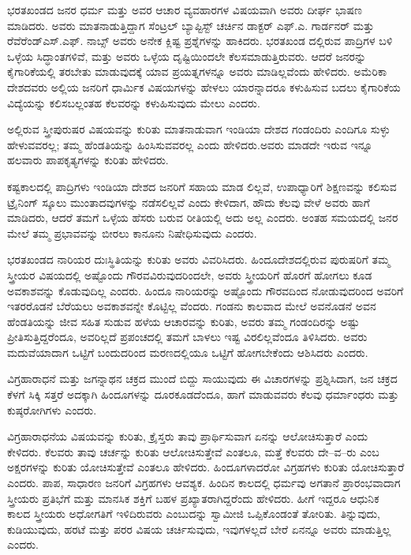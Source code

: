 ಭರತಖಂಡದ ಜನರ ಧರ್ಮ ಮತ್ತು ಅವರ ಆಚಾರ ವ್ಯವಹಾರಗಳ ವಿಷಯವಾಗಿ ಅವರು ದೀರ್ಘ ಭಾಷಣ ಮಾಡಿದರು. ಅವರು ಮಾತನಾಡುತ್ತಿದ್ದಾಗ ಸೆಂಟ್ರಲ್​ ಬ್ಯಾಪ್ಟಿಸ್ಟ್​ ಚರ್ಚಿನ ಡಾಕ್ಟರ್​ ಎಫ್​.ಎ. ಗಾರ್ಡನರ್​ ಮತ್ತು ರೆವೆರೆಂಡ್​ ಎಸ್​.ಎಫ್​. ನಾಬ್ಸ್​ ಅವರು ಅನೇಕ ಕ್ಲಿಷ್ಟ ಪ್ರಶ್ನೆಗಳನ್ನು ಹಾಕಿದರು. ಭರತಖಂಡ ದಲ್ಲಿರುವ ಪಾದ್ರಿಗಳ ಬಳಿ ಒಳ್ಳೆಯ ಸಿದ್ಧಾಂತಗಳಿವೆ, ಮತ್ತು ಅವರು ಒಳ್ಳೆಯ ದೃಷ್ಟಿಯಿಂದಲೇ ಕೆಲಸಮಾಡುತ್ತಿರುವರು. ಆದರೆ ಜನರನ್ನು ಕೈಗಾರಿಕೆಯಲ್ಲಿ ತರಬೇತು ಮಾಡುವುದಕ್ಕೆ ಯಾವ ಪ್ರಯತ್ನಗಳನ್ನೂ ಅವರು ಮಾಡಿಲ್ಲವೆಂದು ಹೇಳಿದರು. ಅಮೆರಿಕಾ ದೇಶದವರು ಅಲ್ಲಿಯ ಜನರಿಗೆ ಧಾರ್ಮಿಕ ವಿಷಯಗಳನ್ನು ಹೇಳಲು ಯಾರನ್ನಾದರೂ ಕಳುಹಿಸುವ ಬದಲು ಕೈಗಾರಿಕೆಯ ವಿದ್ಯೆಯನ್ನು ಕಲಿಸಬಲ್ಲಂತಹ ಕೆಲವರನ್ನು ಕಳುಹಿಸುವುದು ಮೇಲು ಎಂದರು.

ಅಲ್ಲಿರುವ ಸ್ತ್ರೀಪುರುಷರ ವಿಷಯವನ್ನು ಕುರಿತು ಮಾತನಾಡುವಾಗ ಇಂಡಿಯಾ ದೇಶದ ಗಂಡಂದಿರು ಎಂದಿಗೂ ಸುಳ್ಳು ಹೇಳುವವರಲ್ಲ; ತಮ್ಮ ಹೆಂಡತಿಯನ್ನು ಹಿಂಸಿಸುವವರಲ್ಲ ಎಂದು ಹೇಳಿದರು.ಅವರು ಮಾಡದೇ ಇರುವ ಇನ್ನೂ ಹಲವಾರು ಪಾಪಕೃತ್ಯಗಳನ್ನು ಕುರಿತು ಹೇಳಿದರು.

ಕಷ್ಟಕಾಲದಲ್ಲಿ ಪಾದ್ರಿಗಳು ಇಂಡಿಯಾ ದೇಶದ ಜನರಿಗೆ ಸಹಾಯ ಮಾಡ ಲಿಲ್ಲವೆ, ಉಪಾಧ್ಯಾರಿಗೆ ಶಿಕ್ಷಣವನ್ನು ಕಲಿಸುವ ಟ್ರೈನಿಂಗ್​ ಸ್ಕೂಲು ಮುಂತಾದವುಗಳನ್ನು ನಡೆಸಲಿಲ್ಲವೆ ಎಂದು ಕೇಳಿದಾಗ, ಹೌದು ಕೆಲವು ವೇಳೆ ಅವರು ಹಾಗೆ ಮಾಡಿದರು, ಆದರೆ ತಮಗೆ ಒಳ್ಳೆಯ ಹೆಸರು ಬರುವ ರೀತಿಯಲ್ಲಿ ಅದು ಅಲ್ಲ ಎಂದರು. ಅಂತಹ ಸಮಯದಲ್ಲಿ ಜನರ ಮೇಲೆ ತಮ್ಮ ಪ್ರಭಾವವನ್ನು ಬೀರಲು ಕಾನೂನು ನಿಷೇಧಿಸುವುದು ಎಂದರು.

ಭರತಖಂಡದ ನಾರಿಯರ ದುಃಸ್ಥಿತಿಯನ್ನು ಕುರಿತು ಅವರು ವಿವರಿಸಿದರು. ಹಿಂದೂದೇಶದಲ್ಲಿರುವ ಪುರುಷರಿಗೆ ತಮ್ಮ ಸ್ತ್ರೀಯರ ವಿಷಯದಲ್ಲಿ ಅಷ್ಟೊಂದು ಗೌರವವಿರುವುದರಿಂದಲೇ, ಅವರು ಸ್ತ್ರೀಯರಿಗೆ ಹೊರಗೆ ಹೋಗಲು ಕೂಡ ಅವಕಾಶವನ್ನು ಕೊಡುವುದಿಲ್ಲ ಎಂದರು. ಹಿಂದೂ ನಾರಿಯರನ್ನು ಅಷ್ಟೊಂದು ಗೌರವದಿಂದ ನೋಡುವುದರಿಂದ ಅವರಿಗೆ ಇತರರೊಡನೆ ಬೆರೆಯಲು ಅವಕಾಶವನ್ನೇ ಕೊಟ್ಟಿಲ್ಲ ವೆಂದರು. ಗಂಡನು ಕಾಲವಾದ ಮೇಲೆ ಅವನೊಡನೆ ಅವನ ಹೆಂಡತಿಯನ್ನು ಜೀವ ಸಹಿತ ಸುಡುವ ಹಳೆಯ ಆಚಾರವನ್ನು ಕುರಿತು, ಅವರು ತಮ್ಮ ಗಂಡಂದಿರನ್ನು ಅಷ್ಟು ಪ್ರೀತಿಸುತ್ತಿದ್ದರೆಂದೂ, ಅವರಿಲ್ಲದೆ ಪ್ರಪಂಚದಲ್ಲಿ ತಮಗೆ ಬಾಳಲು ಇಷ್ಟ ವಿರಲಿಲ್ಲವೆಂದೂ ತಿಳಿಸಿದರು. ಅವರು ಮದುವೆಯಾದಾಗ ಒಟ್ಟಿಗೆ ಬಂದುದರಿಂದ ಮರಣದಲ್ಲಿಯೂ ಒಟ್ಟಿಗೆ ಹೋಗಬೇಕೆಂದು ಆಶಿಸಿದರು ಎಂದರು.

ವಿಗ್ರಹಾರಾಧನೆ ಮತ್ತು ಜಗನ್ನಾಥನ ಚಕ್ರದ ಮುಂದೆ ಬಿದ್ದು ಸಾಯುವುದು ಈ ವಿಚಾರಗಳನ್ನು ಪ್ರಶ್ನಿಸಿದಾಗ, ಜನ ಚಕ್ರದ ಕೆಳಗೆ ಸಿಕ್ಕಿ ಸತ್ತರೆ ಅದಕ್ಕಾಗಿ ಹಿಂದೂಗಳನ್ನು ದೂರಕೂಡದೆಂದೂ, ಹಾಗೆ ಮಾಡುವವರು ಕೆಲವು ಧರ್ಮಾಂಧರು ಮತ್ತು ಕುಷ್ಠರೋಗಿಗಳು ಎಂದರು.

ವಿಗ್ರಹಾರಾಧನೆಯ ವಿಷಯವನ್ನು ಕುರಿತು, ಕ್ರೈಸ್ತರು ತಾವು ಪ್ರಾರ್ಥಿಸುವಾಗ ಏನನ್ನು ಆಲೋಚಿಸುತ್ತಾರೆ ಎಂದು ಕೇಳಿದರು. ಕೆಲವರು ತಾವು ಚರ್ಚನ್ನು ಕುರಿತು ಆಲೋಚಿಸುತ್ತೇವೆ ಎಂತಲೂ, ಮತ್ತೆ ಕೆಲವರು ದೇ–ವ–ರು ಎಂಬ ಅಕ್ಷರಗಳನ್ನು ಕುರಿತು ಯೋಚಿಸುತ್ತೇವೆ ಎಂತಲೂ ಹೇಳಿದರು. ಹಿಂದೂಗಳಾದರೋ ವಿಗ್ರಹಗಳು ಕುರಿತು ಯೋಚಿಸುತ್ತಾರೆ ಎಂದರು. ಪಾಪ, ಸಾಧಾರಣ ಜನರಿಗೆ ವಿಗ್ರಹಗಳು ಆವಶ್ಯಕ. ಹಿಂದಿನ ಕಾಲದಲ್ಲಿ ಧರ್ಮವು ಅಗತಾನೆ ಪ್ರಾರಂಭವಾದಾಗ ಸ್ತ್ರೀಯರು ಪ್ರತಿಭೆಗೆ ಮತ್ತು ಮಾನಸಿಕ ಶಕ್ತಿಗೆ ಬಹಳ ಪ್ರಖ್ಯಾತರಾಗಿದ್ದರೆಂದು ಹೇಳಿದರು. ಹೀಗೆ ಇದ್ದರೂ ಆಧುನಿಕ ಕಾಲದ ಸ್ತ್ರೀಯರು ಅಧೋಗತಿಗೆ ಇಳಿದಿರುವರು ಎಂಬುದನ್ನು ಸ್ವಾಮೀಜಿ ಒಪ್ಪಿಕೊಂಡಂತೆ ತೋರಿತು. ತಿನ್ನುವುದು, ಕುಡಿಯುವುದು, ಹರಟೆ ಮತ್ತು ಪರರ ವಿಷಯ ಚರ್ಚಿಸುವುದು, ಇವುಗಳಲ್ಲದೆ ಬೇರೆ ಏನನ್ನೂ ಅವರು ಮಾಡುತ್ತಿಲ್ಲ ಎಂದರು.

